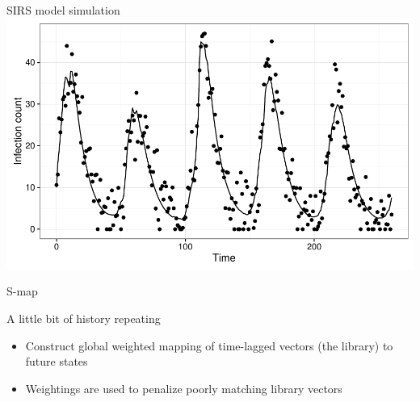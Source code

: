 \documentclass[12pt]{beamer}
\begin{document}
\begin{frame}

	\null
	\large
	SIRS model simulation \\
	\vspace{\baselineskip}
	\includegraphics[width=\textwidth,height=\textheight,keepaspectratio=true]{../../writing/SIRS-SMAP/images/dataplot}

\end{frame}

\begin{frame}

	\null
	\large
	S-map
	\vspace{\baselineskip}
	\footnotesize

	A little bit of history repeating

	\begin{itemize}
		\item Construct global weighted mapping of time-lagged vectors (the library) to future states
		\item Weightings are used to penalize poorly matching library vectors
	\end{itemize}

\end{frame}
\end{document}
